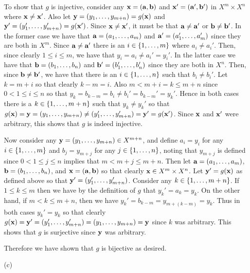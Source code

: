 {{    To show that $g$ is injective, consider any $\mathbf{x} = (\mathbf{a}, \mathbf{b})$ and $\mathbf{x}' = (\mathbf{a}', \mathbf{b}')$ in  $X^m \times X^n$ where $\mathbf{x} \neq \mathbf{x}'$.
    Also let $\mathbf{y} = (y_1, \ldots, y_{m+n}) = g(\mathbf{x})$ and $\mathbf{y}' = (y_1', \ldots, y_{m+n}') = g(\mathbf{x}')$.
    Since $\mathbf{x} \neq \mathbf{x}'$, it must be that $\mathbf{a} \neq \mathbf{a}'$ or $\mathbf{b} \neq \mathbf{b}'$.
    In the former case we have that $\mathbf{a} = (a_1, \ldots, a_m)$ and $\mathbf{a}' = (a_1', \ldots, a_m')$ since they are both in $X^m$.
    Since $\mathbf{a} \neq \mathbf{a}'$ there is an $i \in \left\{ 1, \ldots, m \right\}$ where $a_i \neq a_i'$.
    Then, since clearly $1 \leq i \leq m$, we have that $y_i = a_i \neq a_i' = y_i'$.
    In the latter case we have that $\mathbf{b} = (b_1, \ldots, b_n)$ and $\mathbf{b}' = (b_1', \ldots, b_n')$ since they are both in $X^n$.
    Then, since $\mathbf{b} \neq \mathbf{b}'$, we have that there is an $i \in \left\{ 1, \ldots, n \right\}$ such that $b_i \neq b_i'$.
    Let $k = m+i$ so that clearly $k-m = i$.
    Also $m < m+i = k \leq m+n$ since $0 < 1 \leq i \leq n$ so that $y_k = b_{k-m} = b_i \neq b_i' = b_{k-m}' = y_k'$.
    Hence in both cases there is a $k \in \left\{ 1, \ldots, m+n \right\}$ such that $y_k \neq y_k'$ so that $g(\mathbf{x}) = \mathbf{y} = (y_1, \ldots, y_{m+n}) \neq (y_1', \ldots, y_{m+n}') = \mathbf{y}' = g(\mathbf{x}')$.
    Since $\mathbf{x}$ and $\mathbf{x}'$ were arbitrary, this shows that $g$ is indeed injective.

    Now consider any $\mathbf{y} = (y_1, \ldots, y_{m+n}) \in X^{m+n}$, and define $a_i = y_i$ for any $i \in \left\{ 1, \ldots, m \right\}$ and $b_j = y_{m+j}$ for any $j \in \left\{ 1, \ldots, n \right\}$, noting that $y_{m+j}$ is defined since $0 < 1 \leq j \leq n$ implies that $m < m+j \leq m+n$.
    Then let $\mathbf{a} = (a_1, \ldots, a_m)$, $\mathbf{b} = (b_1, \ldots, b_n)$, and $\mathbf{x} = (\mathbf{a},\mathbf{b})$ so that clearly $\mathbf{x} \in X^m \times X^n$.
    Let $\mathbf{y}' = g(\mathbf{x})$ as defined above so that $\mathbf{y}' = (y_1', \ldots, y_{m+n}')$.
    Consider any $k \in \left\{ 1, \ldots, m+n \right\}$.
    If $1 \leq k \leq m$ then we have by the definition of $g$ that $y_k' = a_k = y_k$.
    On the other hand, if $m < k \leq m+n$, then we have $y_k' = b_{k-m} = y_{m+(k-m)} = y_k$.
    Thus in both cases $y_k' = y_k$ so that clearly $g(\mathbf{x}) = \mathbf{y}' = (y_1', \ldots, y_{m+n}') = (y_1, \ldots, y_{m+n}) = \mathbf{y}$ since $k$ was arbitrary.
    This shows that $g$ is surjective since $\mathbf{y}$ was arbitrary.

    Therefore we have shown that $g$ is bijective as desired.
  }

  (c) \partc
  }
